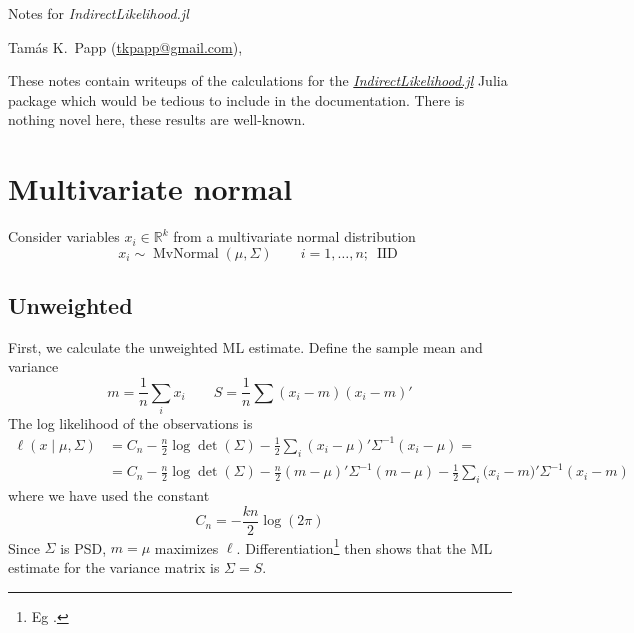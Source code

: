 \documentclass[b5paper,11pt]{article}
\DeclareMathOperator{\mvnormal}{MvNormal}
\DeclareMathOperator{\IID}{IID}
\newcommand{\reals}{\mathbb{R}}
\begin{document}
\begin{center}
  {\Large{Notes for \textsl{IndirectLikelihood.jl}}}

  \smallskip

  Tam\'as K.~Papp (\url{tkpapp@gmail.com}), \textsl{\DTMtoday}
\end{center}

\noindent These notes contain writeups of the calculations for the \href{https://github.com/tpapp/IndirectLikelihood.jl}{\textsl{IndirectLikelihood.jl}} Julia package which would be tedious to include in the documentation. There is nothing novel here, these results are well-known.

\section{Multivariate normal}
\label{sec:multivariate-normal}

Consider variables $x_i \in \reals^k$ from a multivariate normal distribution
\begin{equation}
  x_i \sim \mvnormal(\mu, \Sigma)
  \qquad
  i = 1, \dots, n;\ \IID
\end{equation}

\subsection{Unweighted}
\label{sec:unweighted}

First, we calculate the unweighted ML estimate. Define the sample mean and variance
\begin{equation}
  m = \frac1n \sum_i x_i
  \qquad
  S = \frac1n \sum (x_i-m)(x_i-m)'
\end{equation}
The log likelihood of the observations is
\begin{align}
  \label{eq:mvnormal-likelihood}
  \ell(x \mid \mu, \Sigma) &= C_n - \frac{n}{2} \log\det(\Sigma) - \frac12 \sum_i (x_i-\mu)'\Sigma^{-1}(x_i-\mu) =\\
              &= C_n - \frac{n}{2} \log\det(\Sigma) - \frac{n}2 (m-\mu)'\Sigma^{-1}(m-\mu)
                - \frac12 \sum_i \bigl(x_i-m)'\Sigma^{-1}(x_i-m)
\end{align}
where we have used the constant
\begin{equation}
  C_n = -\frac{kn}{2} \log(2\pi)
\end{equation}
Since $\Sigma$ is PSD, $m=\mu$ maximizes $\ell$. Differentiation\footnote{Eg \textcite{minka2000old}.} then shows that the ML estimate for the variance matrix is $\Sigma=S$.
\end{document}
